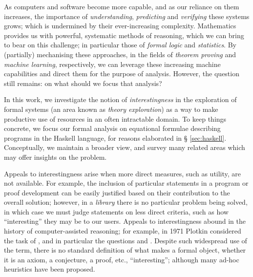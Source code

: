 As computers and software become more capable, and as our reliance on them
increases, the importance of \emph{understanding}, \emph{predicting} and
\emph{verifying} these systems grows; which is undermined by their
ever-increasing complexity. Mathematics provides us with powerful, systematic
methods of reasoning, which we can bring to bear on this challenge; in
particular those of \emph{formal logic} and \emph{statistics}. By (partially)
mechanising these approaches, in the fields of \emph{theorem proving} and
\emph{machine learning}, respectively, we can leverage these increasing machine
capabilities and direct them for the purpose of analysis. However, the question
still remains: on what should we focus that analysis?

In this work, we investigate the notion of \emph{interestingness} in the
exploration of formal systems (an area known as \emph{theory exploration}) as a
way to make productive use of resources in an often intractable domain. To keep
things concrete, we focus our formal analysis on equational formulae describing
programs in the Haskell language, for reasons elaborated in \S
\ref{sec:haskell}. Conceptually, we maintain a broader view, and survey many
related areas which may offer insights on the problem.

Appeals to interestingness arise when more direct measures, such as utility, are
not available. For example, the inclusion of particular statements in a program
or proof development can be easily justified based on their contribution to the
overall solution; however, in a \emph{library} there is no particular problem
being solved, in which case we must judge statements on less direct criteria,
such as how ``interesting'' they may be to our users. Appeals to interestingness
abound in the history of computer-assisted reasoning; for example, in 1971
Plotkin \cite{plotkin1971further} considered the task of , and in particular the questions
 and . Despite such widespread use of the term, there is no
standard definition of what makes a formal object, whether it is an axiom, a
conjecture, a proof, etc., ``interesting''; although many ad-hoc heuristics have
been proposed.

